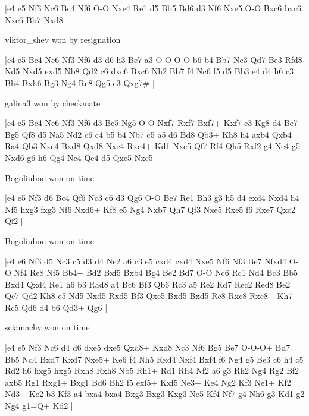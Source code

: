 \makegametitle
|e4 e5 Nf3 Nc6 Bc4 Nf6 O-O Nxe4 Re1 d5 Bb5 Bd6 d3 Nf6 Nxe5 O-O Bxc6 bxc6 Nxc6 Bb7 Nxd8  |

\showboard

viktor\_shev won by resignation

\makegametitle
|e4 e5 Bc4 Nc6 Nf3 Nf6 d3 d6 h3 Be7 a3 O-O O-O b6 b4 Bb7 Nc3 Qd7 Be3 Rfd8 Nd5 Nxd5 exd5 Nb8 Qd2 c6 dxc6 Bxc6 Nh2 Bb7 f4 Nc6 f5 d5 Bb3 e4 d4 h6 c3 Bh4 Bxh6 Bg3 Ng4 Re8 Qg5 e3 Qxg7\#  |

\showboard

galina3 won by checkmate

\makegametitle
|e4 e5 Bc4 Nc6 Nf3 Nf6 d3 Bc5 Ng5 O-O Nxf7 Rxf7 Bxf7+ Kxf7 c3 Kg8 d4 Be7 Bg5 Qf8 d5 Na5 Nd2 c6 c4 b5 b4 Nb7 c5 a5 d6 Bd8 Qb3+ Kh8 h4 axb4 Qxb4 Ra4 Qb3 Nxe4 Bxd8 Qxd8 Nxe4 Rxe4+ Kd1 Nxc5 Qf7 Rf4 Qh5 Rxf2 g4 Ne4 g5 Nxd6 g6 h6 Qg4 Nc4 Qe4 d5 Qxe5 Nxe5  |

\showboard

Bogoliubon won on time

\makegametitle
|e4 e5 Nf3 d6 Bc4 Qf6 Nc3 c6 d3 Qg6 O-O Be7 Re1 Bh3 g3 h5 d4 exd4 Nxd4 h4 Nf5 hxg3 fxg3 Nf6 Nxd6+ Kf8 e5 Ng4 Nxb7 Qh7 Qf3 Nxe5 Rxe5 f6 Rxe7 Qxc2 Qf2  |

\showboard

Bogoliubon won on time

\makegametitle
|e4 e6 Nf3 d5 Nc3 c5 d3 d4 Ne2 a6 c3 e5 cxd4 cxd4 Nxe5 Nf6 Nf3 Be7 Nfxd4 O-O Nf4 Re8 Nf5 Bb4+ Bd2 Bxf5 Bxb4 Bg4 Be2 Bd7 O-O Nc6 Rc1 Nd4 Bc3 Bb5 Bxd4 Qxd4 Re1 h6 b3 Rad8 a4 Bc6 Bf3 Qb6 Rc3 a5 Re2 Rd7 Rec2 Red8 Be2 Qc7 Qd2 Kh8 e5 Nd5 Nxd5 Rxd5 Bf3 Qxe5 Bxd5 Bxd5 Rc8 Rxc8 Rxc8+ Kh7 Rc5 Qd6 d4 b6 Qd3+ Qg6  |

\showboard

sciamachy won on time

\makegametitle
|e4 e5 Nf3 Nc6 d4 d6 dxe5 dxe5 Qxd8+ Kxd8 Nc3 Nf6 Bg5 Be7 O-O-O+ Bd7 Bb5 Nd4 Bxd7 Kxd7 Nxe5+ Ke6 f4 Nh5 Rxd4 Nxf4 Bxf4 f6 Ng4 g5 Be3 c6 h4 c5 Rd2 h6 hxg5 hxg5 Rxh8 Rxh8 Nb5 Rh1+ Rd1 Rh4 Nf2 a6 g3 Rh2 Ng4 Rg2 Bf2 axb5 Rg1 Rxg1+ Bxg1 Bd6 Bh2 f5 exf5+ Kxf5 Ne3+ Ke4 Ng2 Kf3 Ne1+ Kf2 Nd3+ Ke2 b3 Kf3 a4 bxa4 bxa4 Bxg3 Bxg3 Kxg3 Ne5 Kf4 Nf7 g4 Nh6 g3 Kd1 g2 Ng4 g1=Q+ Kd2  |

